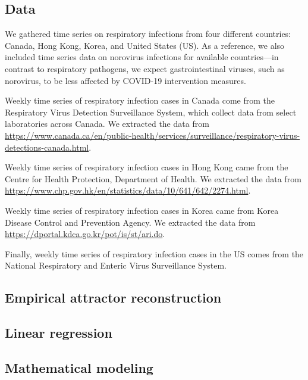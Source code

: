 \documentclass[12pt]{article}
\begin{document}
\subsection*{Data}

We gathered time series on respiratory infections from four different countries: Canada, Hong Kong, Korea, and United States (US).
As a reference, we also included time series data on norovirus infections for available countries---in contrast to respiratory pathogens, we expect gastrointestinal viruses, such as norovirus, to be less affected by COVID-19 intervention measures.

Weekly time series of respiratory infection cases in Canada come from the Respiratory Virus Detection Surveillance System, which collect data from select laboratories across Canada.
We extracted the data from \url{https://www.canada.ca/en/public-health/services/surveillance/respiratory-virus-detections-canada.html}.

Weekly time series of respiratory infection cases in Hong Kong came from the Centre for Health Protection, Department of Health. 
We extracted the data from \url{https://www.chp.gov.hk/en/statistics/data/10/641/642/2274.html}.

Weekly time series of respiratory infection cases in Korea came from Korea Disease Control and Prevention Agency.
We extracted the data from \url{https://dportal.kdca.go.kr/pot/is/st/ari.do}.

Finally, weekly time series of respiratory infection cases in the US comes from the National Respiratory and Enteric Virus Surveillance System.

\subsection*{Empirical attractor reconstruction}

\subsection*{Linear regression}

\subsection*{Mathematical modeling}
\end{document}
